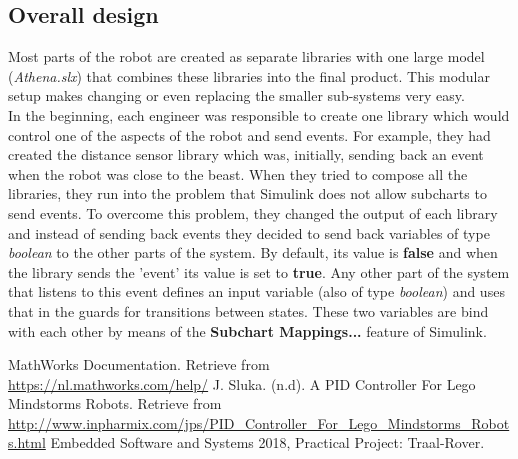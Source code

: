 \documentclass[a4paper,12pt]{article}
\begin{document}
\subsection{Overall design}
Most parts of the robot are created as separate libraries with one large model (\textit{Athena.slx}) that combines these libraries into the final product. This modular setup makes changing or even replacing the smaller sub-systems very easy.\\
In the beginning, each engineer was responsible to create one library which would control one of the aspects of the robot and send events. For example, they had created the distance sensor library which was, initially, sending back an event when the robot was close to the beast. When they tried to compose all the libraries, they run into the problem that Simulink does not allow subcharts to send events. To overcome this problem, they changed the output of each library and instead of sending back events they decided to send back variables of type \textit{boolean} to the other parts of the system. By default, its value is \textbf{false} and when the library sends the 'event' its value is set to \textbf{true}. Any other part of the system that listens to this event defines an input variable (also of type \textit{boolean}) and uses that in the guards for transitions between states. These two variables are bind with each other by means of the \textbf{Subchart Mappings...} feature of Simulink.


\begin{thebibliography}{9}
\bibitem{} MathWorks Documentation. Retrieve from\\
\url{https://nl.mathworks.com/help/}
\bibitem{}J. Sluka. (n.d). A PID Controller For Lego Mindstorms Robots. Retrieve from\\
\url{http://www.inpharmix.com/jps/PID_Controller_For_Lego_Mindstorms_Robots.html}
\bibitem{} Embedded Software and Systems 2018, Practical Project: Traal-Rover.
\end{thebibliography}
\end{document}
